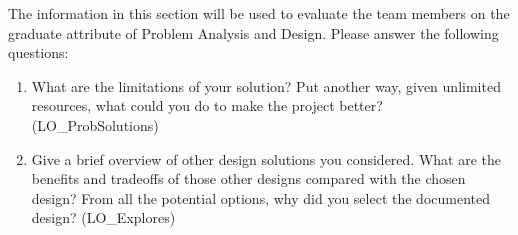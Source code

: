 \documentclass[12pt, titlepage]{article}
\begin{document}
The information in this section will be used to evaluate the team members on the
graduate attribute of Problem Analysis and Design.  Please answer the following questions:

\begin{enumerate}
  \item What are the limitations of your solution?  Put another way, given
  unlimited resources, what could you do to make the project better? (LO\_ProbSolutions)
  \item Give a brief overview of other design solutions you considered.  What
  are the benefits and tradeoffs of those other designs compared with the chosen
  design?  From all the potential options, why did you select the documented design?
  (LO\_Explores)
\end{enumerate}
\end{document}
